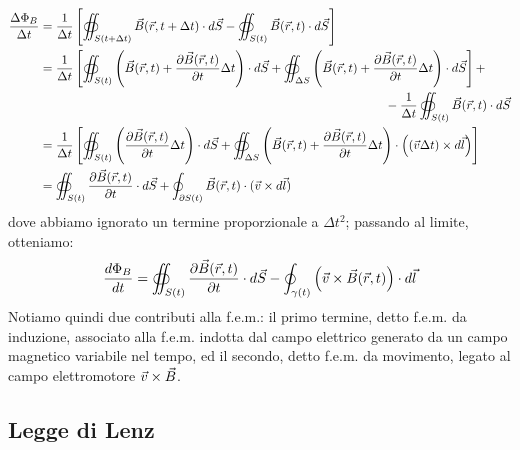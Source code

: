 \documentclass[]{article}
\begin{document}
\begin{equation}
	\begin{split}
		\frac{\Delta\Phi_B}{\Delta t} &= \frac{1}{\Delta t} \left[ \oiint_{S(t+\Delta t)} \vec{B}(\vec{r},t+\Delta t) \cdot d\vec{S} - \oiint_{S(t)} \vec{B}(\vec{r},t)\cdot d\vec{S} \right] \\ 
					      &= \frac{1}{\Delta t} \left[ \oiint_{S(t)} \left( \vec{B}(\vec{r},t) + \frac{\partial\vec{B}(\vec{r},t)}{\partial t} \Delta t \right) \cdot d\vec{S} + \oiint_{\Delta S} \left( \vec{B}(\vec{r},t) + \frac{\partial\vec{B}(\vec{r},t)}{\partial t} \Delta t \right) \cdot d\vec{S} \right] + \\ 
					      & \qquad\qquad\qquad\qquad\qquad\qquad\qquad\qquad\qquad\qquad\qquad\qquad\qquad\qquad -\frac{1}{\Delta t} \oiint_{S(t)} \vec{B}(\vec{r},t)\cdot d\vec{S} \\ 
					      &= \frac{1}{\Delta t} \left[ \oiint_{S(t)} \left( \frac{\partial\vec{B}(\vec{r},t)}{\partial t} \Delta t \right) \cdot d\vec{S} + \oiint_{\Delta S} \left( \vec{B}(\vec{r},t) + \frac{\partial\vec{B}(\vec{r},t)}{\partial t} \Delta t \right) \cdot \left((\vec{v}\Delta t)\times d\vec{l}\right) \right] \\ 
					      &= \oiint_{S(t)} \frac{\partial\vec{B}(\vec{r},t)}{\partial t} \cdot d\vec{S} + \oint_{\partial S(t)} \vec{B}(\vec{r},t)\cdot (\vec{v}\times d\vec{l})
	\end{split}
	\label{eq:14}
\end{equation}
dove abbiamo ignorato un termine proporzionale a $ \Delta t^2 $; passando al limite, otteniamo:
\begin{equation}
	\frac{d\Phi_B}{dt} = \oiint_{S(t)} \frac{\partial\vec{B}(\vec{r},t)}{\partial t} \cdot d\vec{S} - \oint_{\gamma(t)} \left(\vec{v}\times\vec{B}(\vec{r},t)\right)\cdot d\vec{l}
	\label{eq:15}
\end{equation}
Notiamo quindi due contributi alla f.e.m.: il primo termine, detto f.e.m. da induzione, associato alla f.e.m. indotta dal campo elettrico generato da un campo magnetico variabile nel tempo, ed il secondo, detto f.e.m. da movimento, legato al campo elettromotore $ \vec{v}\times\vec{B} $.

\subsection{Legge di Lenz}
\end{document}
